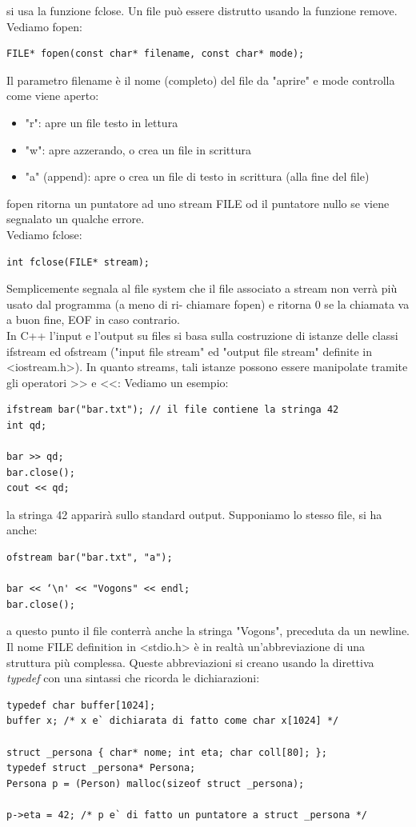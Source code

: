 \documentclass[a4paper,12pt, oneside]{book}
\begin{document}
si usa la funzione fclose. Un file può essere distrutto usando la funzione remove. \\
Vediamo fopen:
\begin{verbatim}
FILE* fopen(const char* filename, const char* mode);
\end{verbatim}
Il parametro filename è il nome (completo) del file da "aprire" e mode controlla come viene aperto:
\begin{itemize}
\item "r": apre un file testo in lettura
\item "w": apre azzerando, o crea un file in scrittura
\item "a" (append): apre o crea un file di testo in scrittura (alla fine del file)
\end{itemize}
fopen ritorna un puntatore ad uno stream FILE od il puntatore
nullo se viene segnalato un qualche errore.
\\
Vediamo fclose:
\begin{verbatim}
int fclose(FILE* stream);
\end{verbatim}
Semplicemente segnala al file system che il file associato a
stream non verrà più usato dal programma (a meno di ri-
chiamare fopen) e ritorna 0 se la chiamata va a buon fine, EOF in caso contrario.\\
In C++ l'input e l'output su files si basa sulla costruzione di istanze delle classi ifstream ed ofstream ("input file stream" ed "output file stream" definite in <iostream.h>). In quanto streams, tali istanze possono essere manipolate
tramite gli operatori >> e <<: Vediamo un esempio:
\begin{verbatim}
ifstream bar("bar.txt"); // il file contiene la stringa 42
int qd;

bar >> qd;
bar.close();
cout << qd;
\end{verbatim}
la stringa 42 apparirà sullo standard output. Supponiamo lo stesso file, si ha anche:
\begin{verbatim}
ofstream bar("bar.txt", "a");

bar << ‘\n' << "Vogons" << endl;
bar.close();
\end{verbatim}
a questo punto il file conterrà anche la stringa "Vogons",
preceduta da un newline.\\
Il nome FILE definition in <stdio.h> è in realtà un'abbreviazione di una struttura più complessa.  Queste abbreviazioni si creano usando la direttiva \textit{typedef }con una
sintassi che ricorda le dichiarazioni:
\begin{verbatim}
typedef char buffer[1024];
buffer x; /* x e` dichiarata di fatto come char x[1024] */ 

struct _persona { char* nome; int eta; char coll[80]; };
typedef struct _persona* Persona;
Persona p = (Person) malloc(sizeof struct _persona); 

p->eta = 42; /* p e` di fatto un puntatore a struct _persona */
\end{verbatim}
\end{document}
